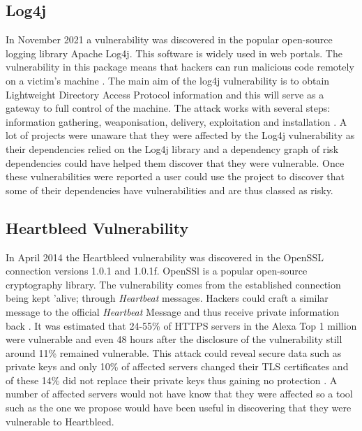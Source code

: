 \documentclass[conference]{IEEEtran}
\begin{document}
\subsection{Log4j}
In November 2021 a vulnerability was discovered in the popular open-source logging library Apache Log4j. This software is widely used in web portals. The vulnerability in this package means that hackers can run malicious code remotely on a victim's machine \cite{h_gupta_identification_2022}. The main aim of the log4j vulnerability is to obtain Lightweight Directory Access Protocol information and this will serve as a gateway to full control of the machine. The attack works with several steps: information gathering, weaponisation, delivery, exploitation and installation \cite{f_maulana_unmasking_2023}. A lot of projects were unaware that they were affected by the Log4j vulnerability as their dependencies relied on the Log4j library and a dependency graph of risk dependencies could have helped them discover that they were vulnerable. Once these vulnerabilities were reported a user could use the project to discover that some of their dependencies have vulnerabilities and are thus classed as risky. 

\subsection{Heartbleed Vulnerability}
In April 2014 the Heartbleed vulnerability was discovered in the OpenSSL connection versions 1.0.1 and 1.0.1f. OpenSSl is a popular open-source cryptography library. The vulnerability comes from the established connection being kept 'alive; through \textit{Heartbeat} messages. Hackers could craft a similar message to the official \textit{Heartbeat} Message and thus receive private information back \cite{s_kyatam_heartbleed_2017}. It was estimated that 24-55\% of HTTPS servers in the Alexa Top 1 million were vulnerable and even 48 hours after the disclosure of the vulnerability still around 11\% remained vulnerable. This attack could reveal secure data such as private keys and only 10\% of affected servers changed their TLS certificates and of these 14\% did not replace their private keys thus gaining no protection \cite{durumeric_matter_2014}. A number of affected servers would not have know that they were affected so a tool such as the one we propose would have been useful in discovering that they were vulnerable to Heartbleed. 
\end{document}
